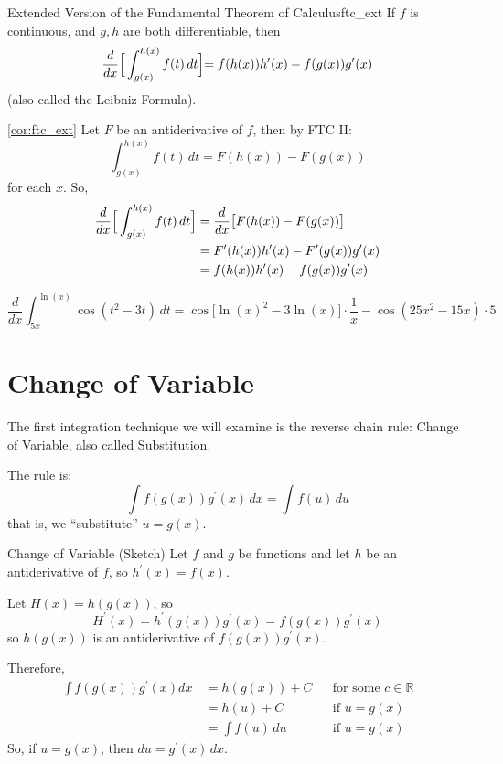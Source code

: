 \begin{Corollary}{Extended Version of the Fundamental Theorem of Calculus}{ftc_ext}
    If $ f $ is continuous, and $ g, h $ are both differentiable, then
    \[ \frac{d}{dx}\Bigr[\int_{g(x)}^{h(x)} f(t)\, d{t} \Bigl]
        =f(h(x))h^\prime(x)-f(g(x))g^\prime(x) \]
    (also called the Leibniz Formula).
\end{Corollary}

\begin{Proof}{\ref{cor:ftc_ext}}{}
    Let $ F $ be an antiderivative of $ f $, then by FTC II\@:
    \[ \int_{g(x)}^{h(x)} f(t)\, d{t}=F(h(x))-F(g(x)) \]
    for each $ x $. So,
    \begin{align*}
        \frac{d}{dx}\Bigr[\int_{g(x)}^{h(x)} f(t)\, d{t} \Bigl]
         & =\frac{d}{dx}\bigl[F(h(x))-F(g(x))\bigr]             \\
         & =F^\prime(h(x))h^\prime(x)-F^\prime(g(x))g^\prime(x) \\
         & =f(h(x))h^\prime(x)-f(g(x))g^\prime(x)
    \end{align*}
\end{Proof}

\begin{Example}{}{}
    \[ \frac{d}{dx}\int_{5x}^{\ln(x)} \cos(t^2-3t)\, d{t}
        =\cos\bigl[\ln(x)^2-3\ln(x)\bigr]\cdot\frac{1}{x}-\cos(25x^2-15x)\cdot 5 \]
\end{Example}

\section{Change of Variable}
The first integration technique we will examine is the reverse chain rule:
Change of Variable, also called Substitution.

The rule is:
\[ \int f(g(x))g^\prime(x)\, d{x}=\int f(u)\, d{u}  \]
that is, we ``substitute'' $ u=g(x) $.

\begin{Proof}{Change of Variable (Sketch)}
    Let $ f $ and $ g $ be functions and let $ h $ be an antiderivative of $ f $,
    so $ h^\prime(x)=f(x) $.

    Let $ H(x)=h(g(x)) $, so
    \[ H^\prime(x)=h^\prime(g(x))g^\prime(x)=f(g(x))g^\prime(x) \]
    so $ h(g(x)) $ is an antiderivative of $ f(g(x))g^\prime(x) $.

    Therefore,
    \begin{align*}
        \int f(g(x))g^\prime(x)d{x}\,
         & =h(g(x))+C        &  & \text{for some }c\in\mathbb{R} \\
         & =h(u)+C           &  & \text{if }u=g(x)               \\
         & =\int f(u)\, d{u} &  & \text{if }u=g(x)
    \end{align*}
    So, if $ u=g(x) $, then $ du=g^\prime(x)\,dx $.
\end{Proof}

